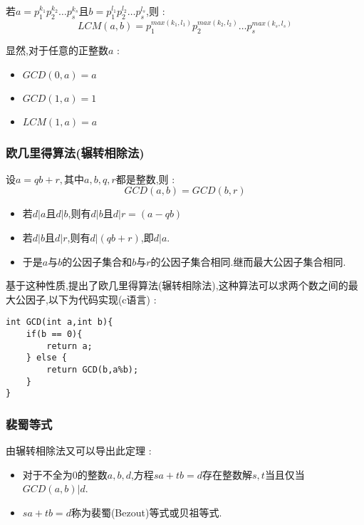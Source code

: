 {{{{        若$a = p_1^{k_1}p_2^{k_2} \dots p_s^{k_s}$且$b = p_1^{l_1}p_2^{l_2} \dots p_s^{l_s}$,则 : $$
        LCM(a,b) = p_1^{max(k_1,l_1)}p_2^{max(k_2,l_2)} \dots p_s^{max(k_s,l_s)}
        $$
    }%

    显然,对于任意的正整数$a$ : 
    \begin{itemize}
        \item $GCD(0,a) = a$
        \item $GCD(1,a) = 1$
        \item $LCM(1,a) = a$
    \end{itemize}

\subsubsection{欧几里得算法(辗转相除法)}{
    设$a = qb + r,$其中$a,b,q,r$都是整数,则 : $$
    GCD(a,b) = GCD(b,r)
    $$

    \begin{itemize}
        \item 若$d | a$且$d | b$,则有$d | b$且$d | r = (a - qb)$
        \item 若$d | b$且$d | r$,则有$d | (qb + r)$,即$d | a$.
        \item 于是$a$与$b$的公因子集合和$b$与$r$的公因子集合相同.继而最大公因子集合相同.
    \end{itemize}    

    基于这种性质,提出了欧几里得算法(辗转相除法),这种算法可以求两个数之间的最大公因子,以下为代码实现(c语言) : 
    \begin{lstlisting}
int GCD(int a,int b){
    if(b == 0){
        return a;
    } else { 
        return GCD(b,a%b);
    }
}
    \end{lstlisting}
}%

\subsubsection{裴蜀等式}{
    由辗转相除法又可以导出此定理 : 
    \begin{itemize}
        \item 对于不全为0的整数$a,b,d$,方程$sa + tb = d$存在整数解$s,t$当且仅当$GCD(a,b) | d$.
        \item $sa + tb = d$称为裴蜀(Bezout)等式或贝祖等式.
    \end{itemize}
}%

}%

}%

 }%